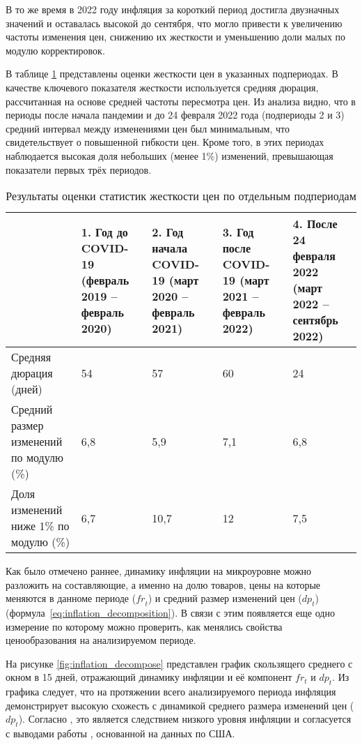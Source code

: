 В то же время в 2022 году инфляция за короткий период достигла двузначных значений и оставалась высокой до сентября, что могло привести к увеличению частоты изменения цен, снижению их жесткости и уменьшению доли малых по модулю корректировок.  

В таблице \ref{tab:price_rigidity_stats} представлены оценки жесткости цен в указанных подпериодах. В качестве ключевого показателя жесткости используется средняя дюрация, рассчитанная на основе средней частоты пересмотра цен. Из анализа видно, что в периоды после начала пандемии и до 24 февраля 2022 года (подпериоды 2 и 3) средний интервал между изменениями цен был минимальным, что свидетельствует о повышенной гибкости цен. Кроме того, в этих периодах наблюдается высокая доля небольших (менее 1\%) изменений, превышающая показатели первых трёх периодов.

\begin{table}[h]
	\centering
	\small %
	\caption{Результаты оценки статистик жесткости цен по отдельным подпериодам}
	\label{tab:price_rigidity_stats}
	\begin{tabularx}{\textwidth}{|X|X|X|X|X|} %
		\hline
		& \textbf{1. Год до COVID-19 (февраль 2019 – февраль 2020)} & \textbf{2. Год начала COVID-19 (март 2020 – февраль 2021)} & \textbf{3. Год после COVID-19 (март 2021 – февраль 2022)} & \textbf{4. После 24 февраля 2022 (март 2022 – сентябрь 2022)} \\
		\hline
		Средняя дюрация (дней) & 54 & 57 & 60 & 24 \\
		\hline
		Средний размер изменений по модулю (\%) & 6,8 & 5,9 & 7,1 & 6,8 \\
		\hline
		Доля изменений ниже 1\% по модулю (\%) & 6,7 & 10,7 & 12 & 7,5 \\
		\hline
	\end{tabularx}
\end{table}

Как было отмечено раннее, динамику инфляции на микроуровне можно разложить на составляющие, а именно на долю товаров, цены на которые меняются в данноме периоде ($\mathit{fr}_t$) и средний размер изменений цен ($\mathit{dp}_t$) (формула~\ref{eq:inflation_decomposition}). В связи с этим появляется еще одно измерение по которому можно проверить, как менялись свойства ценообразования на анализируемом периоде.

На рисунке \ref{fig:inflation_decompose} представлен график скользящего среднего с окном в 15 дней, отражающий динамику инфляции и её компонент $fr_t$ и $dp_t$. Из графика следует, что на протяжении всего анализируемого периода инфляция демонстрирует высокую схожесть с динамикой среднего размера изменений цен ($dp_t$). Согласно \cite{gagnon2009}, это является следствием низкого уровня инфляции и согласуется с выводами работы \cite{KlenowKryvtsov2008}, основанной на данных по США.  

